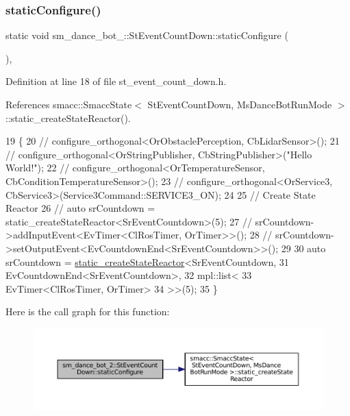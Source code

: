 \subsubsection{\texorpdfstring{static\+Configure()}{staticConfigure()}}
{\footnotesize\ttfamily static void sm\+\_\+dance\+\_\+bot\+\_\+::\+St\+Event\+Count\+Down\+::static\+Configure (\begin{DoxyParamCaption}{ }\end{DoxyParamCaption})\hspace{0.3cm}{\ttfamily [inline]}, {\ttfamily [static]}}



Definition at line 18 of file st\+\_\+event\+\_\+count\+\_\+down.\+h.



References smacc\+::\+Smacc\+State$<$ St\+Event\+Count\+Down, Ms\+Dance\+Bot\+Run\+Mode $>$\+::static\+\_\+create\+State\+Reactor().


\begin{DoxyCode}
19     \{
20         \textcolor{comment}{//   configure\_orthogonal<OrObstaclePerception, CbLidarSensor>();}
21         \textcolor{comment}{//   configure\_orthogonal<OrStringPublisher, CbStringPublisher>("Hello World!");}
22         \textcolor{comment}{//   configure\_orthogonal<OrTemperatureSensor, CbConditionTemperatureSensor>();}
23         \textcolor{comment}{//   configure\_orthogonal<OrService3, CbService3>(Service3Command::SERVICE3\_ON);      }
24         
25         \textcolor{comment}{// Create State Reactor}
26         \textcolor{comment}{// auto srCountdown = static\_createStateReactor<SrEventCountdown>(5);        }
27         \textcolor{comment}{// srCountdown->addInputEvent<EvTimer<ClRosTimer, OrTimer>>();}
28         \textcolor{comment}{// srCountdown->setOutputEvent<EvCountdownEnd<SrEventCountdown>>();}
29 
30         \textcolor{keyword}{auto} srCountdown = \hyperlink{classsmacc_1_1SmaccState_a892be704b48f93bf5c35635d1a58ed54}{static\_createStateReactor}<SrEventCountdown, 
31                                                     EvCountdownEnd<SrEventCountdown>, 
32                                                     mpl::list<
33                                                             EvTimer<ClRosTimer, OrTimer>
34                                                             >>(5);
35     \}
\end{DoxyCode}
Here is the call graph for this function\+:
\nopagebreak
\begin{figure}[H]
\begin{center}
\leavevmode
\includegraphics[width=350pt]{structsm__dance__bot__2_1_1StEventCountDown_af5c378d5ea5e77c6ed3bc5e8870e4bcc_cgraph}
\end{center}
\end{figure}


